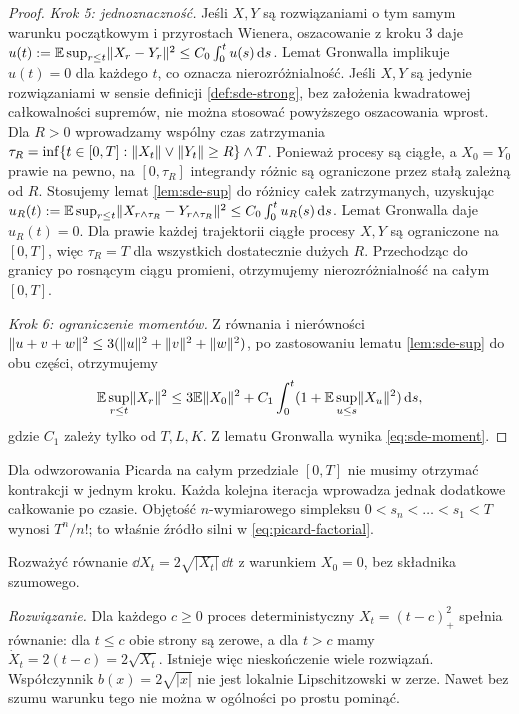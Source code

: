 \begin{proof}
\emph{Krok 5: jednoznaczność.} Jeśli $X,Y$ są
rozwiązaniami o tym samym warunku początkowym i
przyrostach Wienera, oszacowanie z kroku 3 daje
$u(t):=\mathbb{E}\sup_{r\le t}\lVert X_r-Y_r\rVert^2
\le C_0\int_0^t u(s)\,\mathrm{d} s$.
Lemat Gronwalla implikuje $u(t)=0$ dla każdego $t$,
co oznacza nierozróżnialność.
Jeśli $X,Y$ są jedynie rozwiązaniami w sensie definicji
\ref{def:sde-strong}, bez założenia kwadratowej całkowalności
supremów, nie można stosować powyższego oszacowania wprost.
Dla $R>0$ wprowadzamy wspólny czas zatrzymania
$\tau_R=\inf\{t\in[0,T]:\lVert X_t\rVert\vee\lVert Y_t\rVert\ge R\}\wedge T$.
Ponieważ procesy są ciągłe, a $X_0=Y_0$ prawie na pewno,
na $[0,\tau_R]$ integrandy różnic są ograniczone przez
stałą zależną od $R$. Stosujemy lemat \ref{lem:sde-sup}
do różnicy całek zatrzymanych, uzyskując
$u_R(t):=\mathbb{E}\sup_{r\le t}\lVert X_{r\wedge\tau_R}-Y_{r\wedge\tau_R}\rVert^2
\le C_0\int_0^t u_R(s)\,\mathrm{d} s$.
Lemat Gronwalla daje $u_R(t)=0$. Dla prawie każdej trajektorii
ciągłe procesy $X,Y$ są ograniczone na $[0,T]$, więc
$\tau_R=T$ dla wszystkich dostatecznie dużych $R$.
Przechodząc do granicy po rosnącym ciągu promieni,
otrzymujemy nierozróżnialność na całym $[0,T]$.

\emph{Krok 6: ograniczenie momentów.}
Z równania i nierówności
$\lVert u+v+w\rVert^2\le3(\lVert u\rVert^2+\lVert v\rVert^2+\lVert w\rVert^2)$,
po zastosowaniu lematu \ref{lem:sde-sup} do obu części,
otrzymujemy
\[
\mathbb{E}\sup_{r\le t}\lVert X_r\rVert^2
\le3\mathbb{E}\lVert X_0\rVert^2+C_1\int_0^t(1+
\mathbb{E}\sup_{u\le s}\lVert X_u\rVert^2)\,\mathrm{d} s,
\]
gdzie $C_1$ zależy tylko od $T,L,K$.
Z lematu Gronwalla wynika \eqref{eq:sde-moment}.
\end{proof}

\begin{uwaga}
Dla odwzorowania Picarda na całym przedziale $[0,T]$
nie musimy otrzymać kontrakcji w jednym kroku.
Każda kolejna iteracja wprowadza jednak dodatkowe
całkowanie po czasie. Objętość $n$-wymiarowego
simpleksu $0<s_n<\dots<s_1<T$ wynosi $T^n/n!$;
to właśnie źródło silni w \eqref{eq:picard-factorial}.
\end{uwaga}

\begin{zadanie}
Rozważyć równanie $\dd X_t=2\sqrt{|X_t|}\,\dd t$
z warunkiem $X_0=0$, bez składnika szumowego.

\emph{Rozwiązanie.} Dla każdego $c\ge0$ proces
deterministyczny $X_t=(t-c)_+^2$ spełnia równanie:
dla $t\le c$ obie strony są zerowe, a dla $t>c$
mamy $\dot X_t=2(t-c)=2\sqrt{X_t}$. Istnieje
więc nieskończenie wiele rozwiązań. Współczynnik
$b(x)=2\sqrt{|x|}$ nie jest lokalnie Lipschitzowski
w zerze. Nawet bez szumu warunku tego nie można
w ogólności po prostu pominąć.
\end{zadanie}


